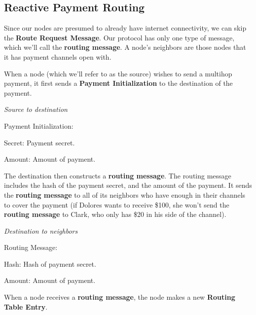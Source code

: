 \documentclass[a4paper]{article}
\newcommand{\bgls}[1]{\textbf{\gls{#1}}}
\newenvironment{mydescription}
{\begin{description}
\setlength{\itemsep}{5pt}
  \setlength{\parskip}{0pt}
  \setlength{\labelsep}{5pt}
}{
\end{description}}
\begin{document}
\subsection{Reactive Payment Routing}

Since our nodes are presumed to already have internet connectivity, we can skip the \textbf{Route Request Message}. Our protocol has only one type of message, which we'll call the \bgls{routing message}. A node's neighbors are those nodes that it has payment channels open with.

When a node (which we'll refer to as the source) wishes to send a multihop payment, it first sends a \textbf{Payment Initialization} to the destination of the payment.

\begin{mdframed}[style=message]{\emph{Source to destination}}
\begin{mydescription}
\item[Payment Initialization:] \hfill
\begin{mydescription}
  \item[Secret:] Payment secret.
  \item[Amount:] Amount of payment.
\end{mydescription}
\end{mydescription}
\end{mdframed}

The destination then constructs a \bgls{routing message}. The routing message includes the hash of the payment secret, and the amount of the payment. It sends the \bgls{routing message} to all of its neighbors who have enough in their channels to cover the payment (if Dolores wants to receive \$100, she won't send the \bgls{routing message} to Clark, who only has \$20 in his side of the channel).

\begin{mdframed}[style=message]{\emph{Destination to neighbors}}
\begin{mydescription}
\item[Routing Message:] \hfill
\begin{mydescription}
  \item[Hash:] Hash of payment secret.
  \item[Amount:] Amount of payment.
\end{mydescription}
\end{mydescription}
\end{mdframed}

When a node receives a \bgls{routing message}, the node makes a new \textbf{Routing Table Entry}.
\end{document}
